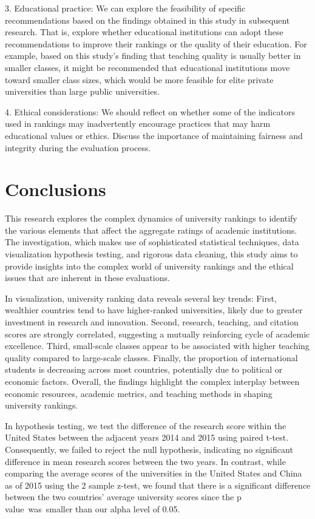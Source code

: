 \documentclass[a4paper]{article}
\begin{document}
3. Educational practice: We can explore the feasibility of specific recommendations based on the findings obtained in this study in subsequent research. That is, explore whether educational institutions can adopt these recommendations to improve their rankings or the quality of their education. For example, based on this study's finding that teaching quality is usually better in smaller classes, it might be recommended that educational institutions move toward smaller class sizes, which would be more feasible for elite private universities than large public universities.

4. Ethical considerations: We should reflect on whether some of the indicators used in rankings may inadvertently encourage practices that may harm educational values or ethics. Discuss the importance of maintaining fairness and integrity during the evaluation process.

\section*{Conclusions}
This research explores the complex dynamics of university rankings to identify the various elements that affect the aggregate ratings of academic institutions. The investigation, which makes use of sophisticated statistical techniques, data visualization hypothesis testing, and rigorous data cleaning, this study aims to provide insights into the complex world of university rankings and the ethical issues that are inherent in these evaluations.

In visualization, university ranking data reveals several key trends: First, wealthier countries tend to have higher-ranked universities, likely due to greater investment in research and innovation. Second, research, teaching, and citation scores are strongly correlated, suggesting a mutually reinforcing cycle of academic excellence. Third, small-scale classes appear to be associated with higher teaching quality compared to large-scale classes. Finally, the proportion of international students is decreasing across most countries, potentially due to political or economic factors. Overall, the findings highlight the complex interplay between economic resources, academic metrics, and teaching methods in shaping university rankings.

In hypothesis testing, we test the difference of the research score within the United States between the adjacent years 2014 and 2015 using paired t-test. Consequently, we failed to reject the null hypothesis, indicating no significant difference in mean research scores between the two years. In contrast, while comparing the average scores of the universities in the United States and China as of 2015 using the 2 sample z-test, we found that there is a significant difference between the two countries' average university scores since the p value was smaller than our alpha level of 0.05.

\clearpage



\end{document}
